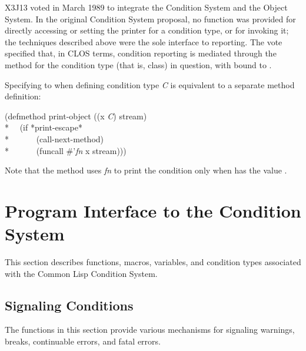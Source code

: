 X3J13 voted in March 1989  to integrate the
Condition System and the Object System.
In the original Condition System proposal,
no function was provided for directly accessing or setting the printer for
a condition type, or for invoking it; the techniques described above were
the sole interface to reporting.  The vote specified that, in CLOS terms,
condition reporting is mediated through the 
method for the condition type (that is, class) in question, with 
bound to .

Specifying  to
 when defining
condition type \emph{C} is equivalent to a separate method definition:
\begin{lisp}
(defmethod print-object ((x \emph{C}) stream) \\*
~~(if *print-escape* \\*
~~~~~~(call-next-method) \\*
~~~~~~(funcall \#'\emph{fn} x stream)))
\end{lisp}
Note that the method uses \emph{fn} to print the condition
only when  has the value .

\section{Program Interface to the Condition System}

This section describes functions, macros, variables, and condition
types associated with the Common Lisp Condition System.

\subsection{Signaling Conditions}
\label{SIGNALLING-CONDITIONS}

The functions in this section provide various mechanisms
for signaling warnings, breaks, continuable errors, and fatal errors.

